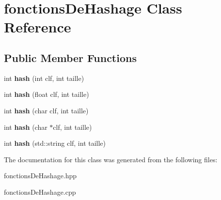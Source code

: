 \hypertarget{classfonctions_de_hashage}{}\section{fonctions\+De\+Hashage Class Reference}
\label{classfonctions_de_hashage}
\subsection*{Public Member Functions}
\begin{DoxyCompactItemize}
\item 
\hypertarget{classfonctions_de_hashage_a0df38b3b2829361a5c3764dbf3df22e9}{}int {\bfseries hash} (int clf, int taille)\label{classfonctions_de_hashage_a0df38b3b2829361a5c3764dbf3df22e9}

\item 
\hypertarget{classfonctions_de_hashage_aab6815ee8db38dc85b194b5da54b51fd}{}int {\bfseries hash} (float clf, int taille)\label{classfonctions_de_hashage_aab6815ee8db38dc85b194b5da54b51fd}

\item 
\hypertarget{classfonctions_de_hashage_a3233476c4cdc233909ad7ed30a532287}{}int {\bfseries hash} (char clf, int taille)\label{classfonctions_de_hashage_a3233476c4cdc233909ad7ed30a532287}

\item 
\hypertarget{classfonctions_de_hashage_a6817765c264206a6605937b38e8b4846}{}int {\bfseries hash} (char $\ast$clf, int taille)\label{classfonctions_de_hashage_a6817765c264206a6605937b38e8b4846}

\item 
\hypertarget{classfonctions_de_hashage_a1ea68c380a6fd5ec929301e0c1c7e206}{}int {\bfseries hash} (std\+::string clf, int taille)\label{classfonctions_de_hashage_a1ea68c380a6fd5ec929301e0c1c7e206}

\end{DoxyCompactItemize}


The documentation for this class was generated from the following files\+:\begin{DoxyCompactItemize}
\item 
fonctions\+De\+Hashage.\+hpp\item 
fonctions\+De\+Hashage.\+cpp\end{DoxyCompactItemize}
